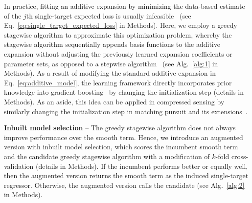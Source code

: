 \documentclass[aps,twocolumn,superscriptaddress,floatfix,preprintnumbers,showkeys]{revtex4}
\begin{document}
In practice, fitting an additive expansion by minimizing the data-based estimate of the $j$th single-target expected loss is usually infeasible~\cite{Mallat_1993, Friedman_2000, Friedman_2001, Vincent_2002, Friedman_2003, Hastie_2009, Donoho_2012} (see Eq.~\ref{eq:single_target_expected_loss} in Methods). Here, we employ a greedy stagewise algorithm to approximate this optimization problem, whereby the stagewise algorithm sequentially appends basis functions to the additive expansion without adjusting the previously learned expansion coefficients or parameter sets, as opposed to a stepwise algorithm~\cite{Mallat_1993, Friedman_2000, Friedman_2001, Vincent_2002, Friedman_2003, Hastie_2009, Donoho_2012} (see Alg.~\ref{alg:1} in Methods). As a result of modifying the standard additive expansion in Eq.~\ref{eq:additive_model}, the learning framework directly incorporates prior knowledge into gradient boosting~\cite{Friedman_2001, Friedman_2003, Hastie_2009, He_2014, Chen_2016, Ke_2017} by changing the initialization step (details in Methods). As an aside, this idea can be applied in compressed sensing by similarly changing the initialization step in matching pursuit and its extensions~\cite{Mallat_1993, Vincent_2002, Donoho_2012}. 

\textbf{Inbuilt model selection} -- The greedy stagewise algorithm does not always improve performance over the smooth term. Hence, we introduce an augmented version with inbuilt model selection, which scores the incumbent smooth term and the candidate greedy stagewise algorithm with a modification of $k$-fold cross-validation (details in Methods). If the incumbent performs better or equally well, then the augmented version returns the smooth term as the induced single-target regressor. Otherwise, the augmented version calls the candidate (see Alg.~\ref{alg:2} in Methods).
\end{document}
